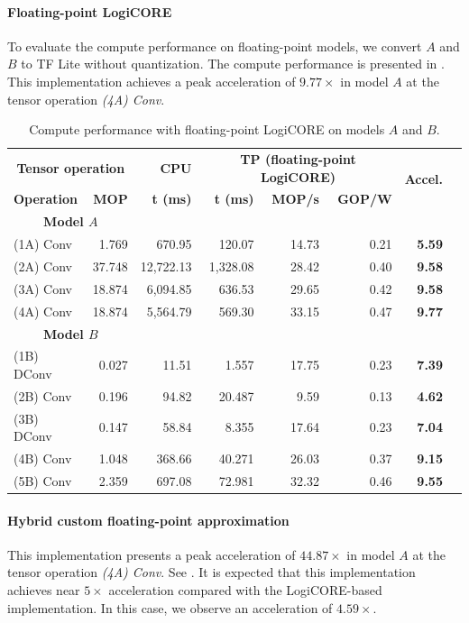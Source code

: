 \paragraph{Floating-point LogiCORE}
To evaluate the compute performance on floating-point models, we convert $A$ and $B$ to TF Lite without quantization. The compute performance is presented in .
This implementation achieves a peak acceleration of $9.77\times$ in model $A$ at the tensor operation \emph{(4A) Conv}.

\begin{table}[!htp]\centering
	\caption{Compute performance with floating-point LogiCORE on models $A$ and $B$.}\label{tab:performace_float_logicore}
	\scriptsize
	\begin{tabular}{lrrrrrrr}\toprule
		\multicolumn{2}{c}{\textbf{Tensor operation}} &\textbf{CPU} &\multicolumn{3}{c}{\textbf{TP (floating-point LogiCORE)}} &\multirow{2}{*}{\textbf{Accel.}} \\\cmidrule{1-6}
		\textbf{Operation} &\textbf{MOP} &\textbf{t (ms)} &\textbf{t (ms)} &\textbf{MOP/s} &\textbf{GOP/W} & \\\midrule
		\multicolumn{2}{c}{\textbf{Model $A$}} & & & & & \\
		(1A) Conv &1.769 &670.95 &120.07 &14.73 &0.21 &\textbf{5.59} \\
		(2A) Conv &37.748 &12,722.13 &1,328.08 &28.42 &0.40 &\textbf{9.58} \\
		(3A) Conv &18.874 &6,094.85 &636.53 &29.65 &0.42 &\textbf{9.58} \\
		(4A) Conv &18.874 &5,564.79 &569.30 &33.15 &0.47 &\textbf{9.77} & \\\midrule
		\multicolumn{2}{c}{\textbf{Model $B$}} & & & & & \\
		(1B) DConv &0.027 &11.51 &1.557 &17.75 &0.23 &\textbf{7.39} \\
		(2B) Conv &0.196 &94.82 &20.487 &9.59 &0.13 &\textbf{4.62} \\
		(3B) DConv &0.147 &58.84 &8.355 &17.64 &0.23 &\textbf{7.04} \\
		(4B) Conv &1.048 &368.66 &40.271 &26.03 &0.37 &\textbf{9.15} \\
		(5B) Conv &2.359 &697.08 &72.981 &32.32 &0.46 &\textbf{9.55} \\
		\bottomrule
	\end{tabular}
\end{table}

\paragraph{Hybrid custom floating-point approximation}
This implementation presents a peak acceleration of $44.87\times$ in model $A$ at the tensor operation \emph{(4A) Conv}. See . It is expected that this implementation achieves near $5\times$ acceleration compared with the LogiCORE-based implementation. In this case, we observe an acceleration of $4.59\times$.

